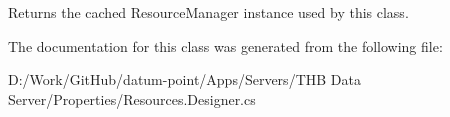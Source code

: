 Returns the cached Resource\+Manager instance used by this class. 



The documentation for this class was generated from the following file\+:\begin{DoxyCompactItemize}
\item 
D\+:/\+Work/\+Git\+Hub/datum-\/point/\+Apps/\+Servers/\+T\+H\+B Data Server/\+Properties/Resources.\+Designer.\+cs\end{DoxyCompactItemize}
